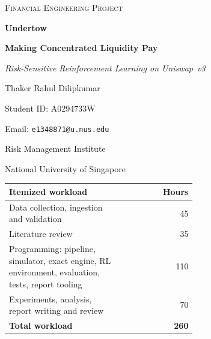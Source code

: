 \begin{titlepage}
\thispagestyle{empty}
\begin{center}
\vspace*{0.6cm}

{\large\scshape Financial Engineering Project\par}

\vspace{1.6cm}

{\Huge\bfseries Undertow\par}

\vspace{0.35cm}

{\Huge\bfseries Making Concentrated Liquidity Pay\par}

\vspace{0.6cm}

{\Large\itshape Risk-Sensitive Reinforcement Learning on Uniswap~v3\par}

\vspace{1.6cm}

{\LARGE Thaker Rahul Dilipkumar\par}
\vspace{0.3cm}
{\large Student ID: A0294733W\par}
{\large Email: \texttt{e1348871@u.nus.edu}\par}

\vspace{0.5cm}

{\large Risk Management Institute\par}
{\large National University of Singapore\par}

\vspace{0.9cm}

\begin{minipage}{0.86\linewidth}
\centering\small
\begin{tabular}{@{}L{0.62\linewidth}r@{}}
\toprule
\textbf{Itemized workload} & \textbf{Hours} \\
\midrule
Data collection, ingestion and validation & 45 \\
Literature review & 35 \\
Programming: pipeline, simulator, exact engine, RL environment, evaluation, tests, report tooling & 110 \\
Experiments, analysis, report writing and review & 70 \\
\midrule
\textbf{Total workload} & \textbf{260} \\
\bottomrule
\end{tabular}
\end{minipage}


\end{center}
\end{titlepage}
